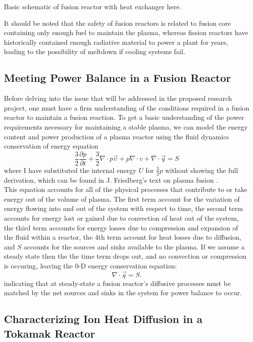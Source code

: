 \documentclass{article}
\begin{document}
Basic schematic of fusion reactor with heat exchanger here.

It should be noted that the safety of fusion reactors is related to fusion core containing only enough fuel to maintain the plasma, whereas fission reactors have historically contained enough radiative material to power a plant for years, leading to the possibility of meltdown if cooling systems fail.
\subsection{Meeting Power Balance in a Fusion Reactor}
Before delving into the issue that will be addressed in the proposed research project, one must have a firm understanding of the conditions required in a fusion reactor to maintain a fusion reaction.	To get a basic understanding of the power requirements necessary for maintaining a stable plasma, we can model the energy content and power production of a plasma reactor using the fluid dynamics conservation of energy equation
$$
\frac{3}{2}\frac{\partial p}{\partial t} + \frac{3}{2}\nabla \cdot p \vec{v} + p\nabla \cdot v + \nabla\cdot \vec{q} = S
$$
where I have substituted the internal energy $U$ for $\frac{3}{2}p$ without showing the full derivation, which can be found in J. Friedberg's text on plasma fusion \cite{J_Friedberg:1}.  \\

This equation accounts for all of the physical processes that contribute to or take energy out of the volume of plasma. The first term account for the variation of energy flowing into and out of the system with respect to time, the second term accounts for energy lost or gained due to convection of heat out of the system,  the third term accounts for energy losses due to compression and expansion of the fluid within a reactor, the 4th term account for heat losses due to diffusion, and $S$ accounts for the sources and sinks available to the plasma. If we assume a steady state then the the time term drops out, and no convection or compression is occuring, leaving the 0-D energy conservation equation:
$$
 \nabla\cdot \vec{q} = S.
$$
indicating that at steady-state a fusion reactor's diffusive processes must be matched by the net sources and sinks in the system for power balance to occur.%

\subsection{Characterizing Ion Heat Diffusion in a Tokamak Reactor}
\end{document}
